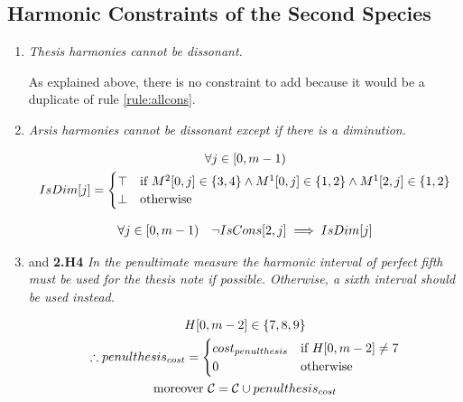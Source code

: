 \subsection*{Harmonic Constraints of the Second Species}
\begin{enumerate}[wide, label=\bfseries 2.H\arabic*]
\item\label{rule:consthesis}{ \textit{Thesis harmonies cannot be dissonant.}}

As explained above, there is no constraint to add because it would be a duplicate of rule \ref{rule:allcons}.

\item\label{rule:arsisdim}{\textit{Arsis harmonies cannot be dissonant except if there is a diminution.}}

\begin{equation}
    \begin{gathered}
        \forall j \in [0, m-1)\\
        IsDim[j] = \begin{cases}
            \top & \text{if } M^2[0, j] \in \{3, 4\} \land M^1[0, j] \in \{1, 2\} \land M^1[2, j] \in \{1, 2\}\\
            \bot & \text{otherwise}
        \end{cases}
    \end{gathered}
\end{equation}

\begin{equation}
    \begin{gathered}
        \forall j \in [0, m-1) \quad
        \lnot IsCons[2, j] \implies IsDim[j]
    \end{gathered}
\end{equation}

\item\label{rule:penult2nd} \label{rule:penultexception}{and \textbf{2.H4} \textit{In the penultimate measure the harmonic interval of perfect fifth must be used for the thesis note if possible. Otherwise, a sixth interval should be used instead.}}
\addtocounter{enumi}{1}

\begin{equation}
    \begin{gathered}
        H[0, m-2] \in \{7, 8, 9\}\\
        \therefore penulthesis_{cost} = \begin{cases}
            cost_{penulthesis} & \text{if } H[0, m-2] \neq 7\\
            0 & \text{otherwise}
        \end{cases}\\
        \text{moreover } \mathcal{C} = \mathcal{C} \cup penulthesis_{cost}
    \end{gathered}
\end{equation}

\end{enumerate}

